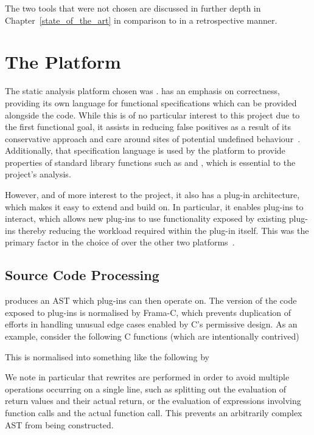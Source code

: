 The two tools that were not chosen are discussed in further depth in Chapter~\ref{state_of_the_art} in comparison to  in a retrospective manner.

\section{The  Platform}

The static analysis platform chosen was .  has an emphasis on correctness, providing its own language for functional specifications which can be provided alongside the code. While this is of no particular interest to this project due to the first functional goal, it assists in reducing false positives as a result of its conservative approach and care around sites of potential undefined behaviour~\cite{framauser}. Additionally, that specification language is used by the platform to provide properties of standard library functions such as \malloc{} and \free{}, which is essential to the project's analysis.

However, and of more interest to the project, it also has a plug-in architecture, which makes it easy to extend and build on. In particular, it enables plug-ins to interact, which allows new plug-ins to use functionality exposed by existing plug-ins thereby reducing the workload required within the plug-in itself. This was the primary factor in the choice of  over the other two platforms~\cite{framaarch}.

\subsection{Source Code Processing}

 produces an AST which plug-ins can then operate on. The version of the code exposed to plug-ins is normalised by Frama-C, which prevents duplication of efforts in handling unusual edge cases enabled by C's permissive design. As an example, consider the following C functions (which are intentionally contrived)



This is normalised into something like the following by 



We note in particular that rewrites are performed in order to avoid multiple operations occurring on a single line, such as splitting out the evaluation of return values and their actual return, or the evaluation of expressions involving function calls and the actual function call. This prevents an arbitrarily complex AST from being constructed.

